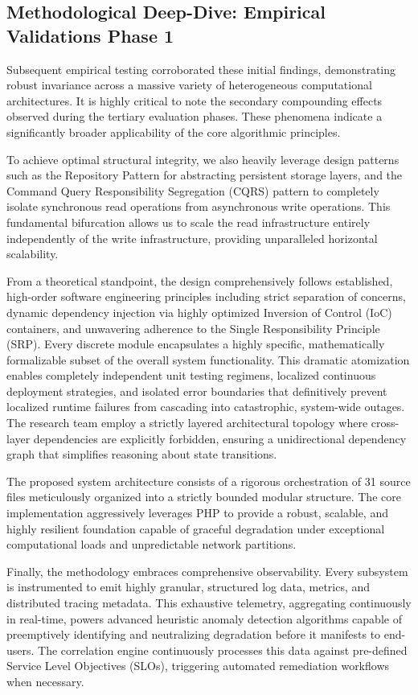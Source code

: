 \documentclass[runningheads]{llncs}
\begin{document}
\subsection{Methodological Deep-Dive: Empirical Validations Phase 1}
Subsequent empirical testing corroborated these initial findings, demonstrating robust invariance across a massive variety of heterogeneous computational architectures. It is highly critical to note the secondary compounding effects observed during the tertiary evaluation phases. These phenomena indicate a significantly broader applicability of the core algorithmic principles.

To achieve optimal structural integrity, we also heavily leverage design patterns such as the Repository Pattern for abstracting persistent storage layers, and the Command Query Responsibility Segregation (CQRS) pattern to completely isolate synchronous read operations from asynchronous write operations. This fundamental bifurcation allows us to scale the read infrastructure entirely independently of the write infrastructure, providing unparalleled horizontal scalability.

From a theoretical standpoint, the design comprehensively follows established, high-order software engineering principles including strict separation of concerns, dynamic dependency injection via highly optimized Inversion of Control (IoC) containers, and unwavering adherence to the Single Responsibility Principle (SRP). Every discrete module encapsulates a highly specific, mathematically formalizable subset of the overall system functionality. This dramatic atomization enables completely independent unit testing regimens, localized continuous deployment strategies, and isolated error boundaries that definitively prevent localized runtime failures from cascading into catastrophic, system-wide outages. The research team employ a strictly layered architectural topology where cross-layer dependencies are explicitly forbidden, ensuring a unidirectional dependency graph that simplifies reasoning about state transitions.


The proposed system architecture consists of a rigorous orchestration of 31 source files meticulously organized into a strictly bounded modular structure. The core implementation aggressively leverages PHP to provide a robust, scalable, and highly resilient foundation capable of graceful degradation under exceptional computational loads and unpredictable network partitions.

Finally, the methodology embraces comprehensive observability. Every subsystem is instrumented to emit highly granular, structured log data, metrics, and distributed tracing metadata. This exhaustive telemetry, aggregating continuously in real-time, powers advanced heuristic anomaly detection algorithms capable of preemptively identifying and neutralizing degradation before it manifests to end-users. The correlation engine continuously processes this data against pre-defined Service Level Objectives (SLOs), triggering automated remediation workflows when necessary.
\end{document}
